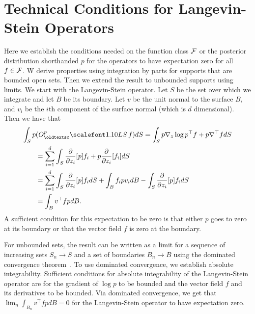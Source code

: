 \appendix

\section{Technical Conditions for Langevin-Stein Operators}
\label{sec:zero_conditions}
Here we establish the conditions needed on the function class $\mathcal{F}$ or the
posterior distribution shorthanded $p$ for the operators to have expectation zero
for all $f \in \mathcal{F}$. W derive properties using integration by parts
for supports that are bounded open sets. Then we extend the result
to unbounded supports using limits. We start with the Langevin-Stein operator. Let $S$ be the
set over which we integrate and let $B$ be its boundary. Let $v$ be the unit normal to
the surface $B$, and $v_i$ be the $i$th component of the surface normal (which is
$d$ dimensional). Then we have that
\begin{align*}
\int_S p  &(O^{p}_\textsc{LS}  \, f) dS =  \int_S p \nabla_z \log p^\top f + p \nabla^\top f dS
\\
&= \sum_{i=1}^d \int_S \frac{\partial}{\partial{z_i}}[p] f_i + p \frac{\partial}{\partial{z_i}}[f_i]dS
\\
&= \sum_{i=1}^d \int_S \frac{\partial}{\partial{z_i}}[p] f_idS + \int_B f_i p v_i dB - \int_S \frac{\partial}{\partial{z_i}}[p] f_idS
\\
&= \int_B v^\top f p dB.
\end{align*}
A sufficient condition for this expectation to be zero is that either $p$ goes to zero at its boundary or that the vector field $f$ is zero at the boundary.


For unbounded sets, the result can be written as a limit for a sequence of increasing sets $S_n \to S$ and a set of boundaries $B_n \to B$ using the dominated convergence theorem~\citep{Cinlar:2011}.
To use dominated convergence, we establish absolute integrability. Sufficient conditions for absolute integrability of the Langevin-Stein operator are for the gradient of $\log p$ to be bounded and the vector field $f$ and its derivatives to be bounded. Via dominated convergence, we get that $\lim_n \int_{B_n} v^\top f p dB = 0$ for the Langevin-Stein operator to have expectation zero.

